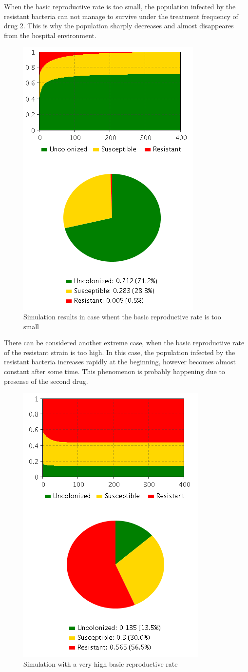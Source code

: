 When the basic reproductive rate is too small, the population infected by the resistant bacteria can not manage to survive under the treatment frequency of drug 2. This is why the population sharply decreases and almost disappeares from the hospital environment.

\begin{figure}[H]
  \centering
  \includegraphics[height=0.7\textwidth]{img/screens/result/result2}
  \caption{Simulation results in case whent the basic reproductive rate is too small}
\end{figure}

There can be considered another extreme case, when the basic reproductive rate of the resistant strain is too high. In this case, the population infected by the resistant bacteria increases rapidly at the beginning, however becomes almost constant after some time. This phenomenon is probably happening due to presense of the second drug.

\begin{figure}[H]
  \centering
  \includegraphics[height=0.7\textwidth]{img/screens/result/result3}
  \caption{Simulation with a very high basic reproductive rate}
\end{figure}
